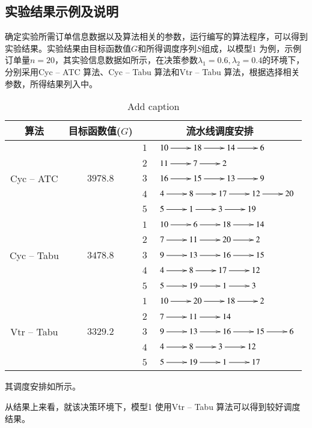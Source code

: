 \subsection{实验结果示例及说明}
确定实验所需订单信息数据以及算法相关的参数，运行编写的算法程序，可以得到实验结果。实验结果由目标函数值$G$和所得调度序列$S$组成，以模型$1$ 为例，示例订单量$n = 20$，其实验信息数据如所示，在决策参数$\lambda_1 = 0.6, \lambda_2 = 0.4$的环境下，分别采用Cyc -- ATC 算法、Cyc -- Tabu 算法和Vtr -- Tabu 算法，根据选择相关参数，所得结果列入中。
\begin{table}[htbp]
  \centering
  \caption{Add caption}
    \begin{tabular}{cccl}
    \toprule
    算法    & 目标函数值($G$) & \multicolumn{2}{c}{流水线调度安排} \\
    \midrule
    \multirow{5}[2]{*}{Cyc -- ATC} & \multirow{5}[2]{*}{$3978.8$} & $1$     &$\xymatrix{10 \ar[r] & 18 \ar[r] & 14 \ar[r] & 6}$\\
          &       & $2$     &  $\xymatrix{11 \ar[r] & 7 \ar[r] & 2}$\\
          &       & $3$     &  $\xymatrix{16 \ar[r] & 15 \ar[r] & 13 \ar[r] & 9}$\\
          &       & $4$     &  $\xymatrix{4 \ar[r] & 8 \ar[r] & 17 \ar[r] & 12 \ar[r]&20}$\\
          &       & $5$     &  $\xymatrix{5 \ar[r] & 1 \ar[r] & 3 \ar[r] & 19}$\\
     \hline
    \multirow{5}[2]{*}{Cyc -- Tabu} & \multirow{5}[2]{*}{$3478.8$} & $1$     &  $\xymatrix{10 \ar[r] & 6 \ar[r] & 18 \ar[r] & 14}$\\
          &       & $2$     & $\xymatrix{7 \ar[r] & 11 \ar[r] & 20 \ar[r] & 2}$ \\
          &       & $3$     &  $\xymatrix{9 \ar[r] & 13 \ar[r] & 16 \ar[r] & 15}$\\
          &       & $4$     &  $\xymatrix{4 \ar[r] & 8 \ar[r] & 17 \ar[r] & 12}$\\
          &       & $5$     &  $\xymatrix{5 \ar[r] & 19 \ar[r] & 1 \ar[r] & 3}$\\
       \hline
    \multirow{5}[2]{*}{Vtr -- Tabu} & \multirow{5}[2]{*}{$3329.2$} & $1$     &  $\xymatrix{10 \ar[r] & 20 \ar[r] & 18 \ar[r] & 2}$\\
          &       & $2$     & $\xymatrix{7 \ar[r] & 11 \ar[r] & 14 }$ \\
          &       & $3$     &  $\xymatrix{9 \ar[r] & 13 \ar[r] & 16 \ar[r] & 15\ar[r]&6}$\\
          &       & $4$     &  $\xymatrix{4\ar[r] & 8 \ar[r] & 3 \ar[r] & 12}$\\
          &       & $5$     &  $\xymatrix{5 \ar[r] & 19 \ar[r] & 1 \ar[r] & 17}$\\
    \bottomrule
    \end{tabular}%
  \label{tab:addlabel}%
\end{table}%
其调度安排如所示。

从结果上来看，就该决策环境下，模型1 使用Vtr -- Tabu 算法可以得到较好调度结果。
